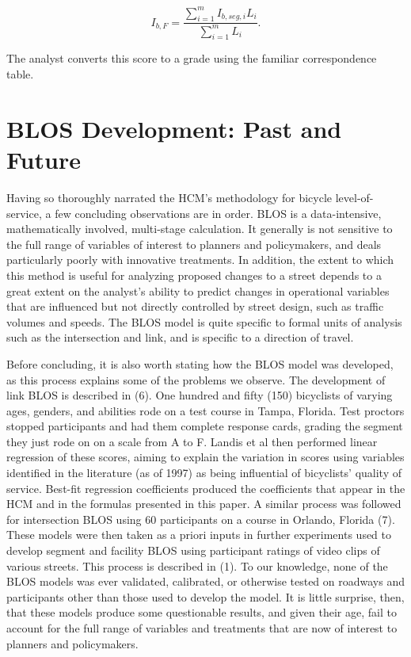 \documentclass[11pt]{article} %
\begin{document}
$$I_{b,F} = \frac{\sum_{i=1}^m I_{b,seg,i} L_i
}
{ \sum_{i=1}^m L_i
}.
$$

The analyst converts this score to a grade using the familiar correspondence table. 

\section{BLOS Development: Past and Future}
Having so thoroughly narrated the HCM's methodology for bicycle level-of-service, a few concluding observations are in order. BLOS is a data-intensive, mathematically involved, multi-stage calculation. It generally is not sensitive to the full range of variables of interest to planners and policymakers, and deals particularly poorly with innovative treatments. In addition, the extent to which this method is useful for analyzing proposed changes to a street depends to a great extent on the analyst's ability to predict changes in operational variables that are influenced but not directly controlled by street design, such as traffic volumes and speeds. The BLOS model is quite specific to formal units of analysis such as the intersection and link, and is specific to a direction of travel. 

Before concluding, it is also worth stating how the BLOS model was developed, as this process explains some of the problems we observe. The development of link BLOS is described in (6). One hundred and fifty (150) bicyclists of varying ages, genders, and abilities rode on a test course in Tampa, Florida. Test proctors stopped participants and had them complete response cards, grading the segment they just rode on on a scale from A to F. Landis et al then performed linear regression of these scores, aiming to explain the variation in scores using variables identified in the literature (as of 1997) as being influential of bicyclists' quality of service. Best-fit regression coefficients produced the coefficients that appear in the HCM and in the formulas presented in this paper. A similar process was followed for intersection BLOS using 60 participants on a course in Orlando, Florida (7). These models were then taken as a priori inputs in further experiments used to develop segment and facility BLOS using participant ratings of video clips of various streets. This process is described in (1). To our knowledge, none of the BLOS models was ever validated, calibrated, or otherwise tested on roadways and participants other than those used to develop the model. It is little surprise, then, that these models produce some questionable results, and given their age, fail to account for the full range of variables and treatments that are now of interest to planners and policymakers.
 
\end{document}
